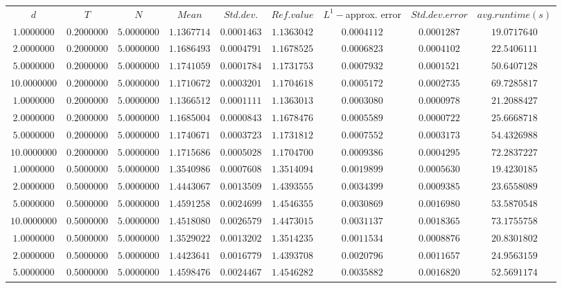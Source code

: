 \begin{tabular}{ccccccccc}
$d$ & $T$ & $N$ & $Mean$ & $Std. dev.$ & $Ref. value$ & $L^1-$approx. error & $Std. dev. error$ & $avg. runtime (s)$\\
$1.0000000$ & $0.2000000$ & $5.0000000$ & $1.1367714$ & $0.0001463$ & $1.1363042$ & $0.0004112$ & $0.0001287$ & $19.0717640$\\
$2.0000000$ & $0.2000000$ & $5.0000000$ & $1.1686493$ & $0.0004791$ & $1.1678525$ & $0.0006823$ & $0.0004102$ & $22.5406111$\\
$5.0000000$ & $0.2000000$ & $5.0000000$ & $1.1741059$ & $0.0001784$ & $1.1731753$ & $0.0007932$ & $0.0001521$ & $50.6407128$\\
$10.0000000$ & $0.2000000$ & $5.0000000$ & $1.1710672$ & $0.0003201$ & $1.1704618$ & $0.0005172$ & $0.0002735$ & $69.7285817$\\
$1.0000000$ & $0.2000000$ & $5.0000000$ & $1.1366512$ & $0.0001111$ & $1.1363013$ & $0.0003080$ & $0.0000978$ & $21.2088427$\\
$2.0000000$ & $0.2000000$ & $5.0000000$ & $1.1685004$ & $0.0000843$ & $1.1678476$ & $0.0005589$ & $0.0000722$ & $25.6668718$\\
$5.0000000$ & $0.2000000$ & $5.0000000$ & $1.1740671$ & $0.0003723$ & $1.1731812$ & $0.0007552$ & $0.0003173$ & $54.4326988$\\
$10.0000000$ & $0.2000000$ & $5.0000000$ & $1.1715686$ & $0.0005028$ & $1.1704700$ & $0.0009386$ & $0.0004295$ & $72.2837227$\\
$1.0000000$ & $0.5000000$ & $5.0000000$ & $1.3540986$ & $0.0007608$ & $1.3514094$ & $0.0019899$ & $0.0005630$ & $19.4230185$\\
$2.0000000$ & $0.5000000$ & $5.0000000$ & $1.4443067$ & $0.0013509$ & $1.4393555$ & $0.0034399$ & $0.0009385$ & $23.6558089$\\
$5.0000000$ & $0.5000000$ & $5.0000000$ & $1.4591258$ & $0.0024699$ & $1.4546355$ & $0.0030869$ & $0.0016980$ & $53.5870548$\\
$10.0000000$ & $0.5000000$ & $5.0000000$ & $1.4518080$ & $0.0026579$ & $1.4473015$ & $0.0031137$ & $0.0018365$ & $73.1755758$\\
$1.0000000$ & $0.5000000$ & $5.0000000$ & $1.3529022$ & $0.0013202$ & $1.3514235$ & $0.0011534$ & $0.0008876$ & $20.8301802$\\
$2.0000000$ & $0.5000000$ & $5.0000000$ & $1.4423641$ & $0.0016779$ & $1.4393708$ & $0.0020796$ & $0.0011657$ & $24.9563159$\\
$5.0000000$ & $0.5000000$ & $5.0000000$ & $1.4598476$ & $0.0024467$ & $1.4546282$ & $0.0035882$ & $0.0016820$ & $52.5691174$\\

\end{tabular}
